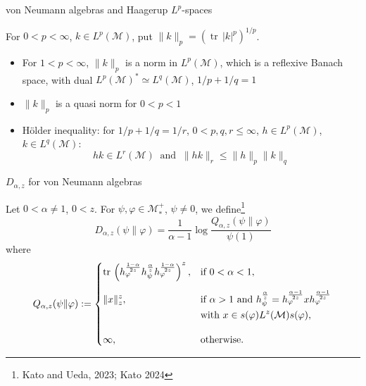 \documentclass[mathserif]{beamer}
\newcommand{\<}{\langle}
\renewcommand{\>}{\rangle}
\newcommand{\Tr}{\operatorname{tr}\,}
\newcommand{\Me}{\mathcal M}
\begin{document}
\begin{frame}{von Neumann algebras and Haagerup $L^p$-spaces}


For $0<p<\infty$, $k\in L^p(\Me)$,  put $\|k\|_p=(\Tr|k|^p)^{1/p}$.

\bigskip

\begin{itemize}


\item For $1<p<\infty$,  $\|k\|_p$ is a norm in $L^p(\Me)$, which  is a reflexive Banach space, 
with dual $L^p(\Me)^*\simeq L^q(\Me)$,
$1/p+1/q=1$ 

\medskip

\item $\|k\|_p$ is a quasi norm for $0<p<1$

\medskip 
\item H\"older inequality: for $1/p+1/q=1/r$, $0<p,q,r\le \infty$, $h\in L^p(\Me)$, $k\in
L^q(\Me)$:
\[
hk\in L^r(\Me) \ \text{ and }\ \|hk\|_r\le \|h\|_p\|k\|_q
\]

\end{itemize}

\end{frame}

\begin{frame}{$D_{\alpha,z}$ for von Neumann algebras}

Let $0<\alpha\ne1$, $0<z$. 
For $\psi,\varphi\in \Me_*^+$, $\psi\ne 0$,  we define\footnote{Kato and Ueda, 2023; Kato 2024}
\[
D_{\alpha,z}(\psi\|\varphi)=\frac{1}{\alpha-1}\log
\frac{Q_{\alpha,z}(\psi\|\varphi)}{\psi(1)}
\]
where
\[
Q_{\alpha,z}(\psi\|\varphi):=\begin{dcases} \Tr
\left(h_\varphi^{\frac{1-\alpha}{2z}}h_\psi^{\frac{\alpha}{z}}h_\varphi^{\frac{1-\alpha}{2z}}\right)^z, &
\text{if } 0<\alpha<1,\\[0.5em]
\|x\|_z^z, & \text{if } \alpha>1 \text{ and }
h_\psi^{\frac{\alpha}{z}}=h_\varphi^{\frac{\alpha-1}{2z}}xh_\varphi^{\frac{\alpha-1}{2z}}
\\[-0.1em] & \text{with } x\in s(\varphi)L^z(\Me)s(\varphi),\\[1em]
\infty,& \text{otherwise}.
\end{dcases}
\]


\end{frame}
\end{document}

